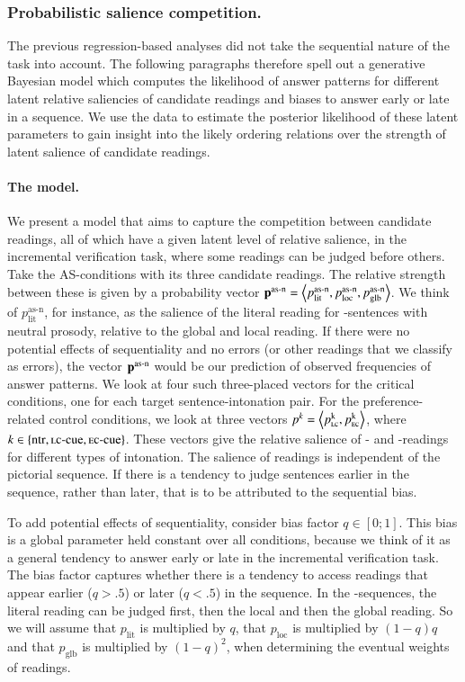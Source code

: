 \documentclass[fleqn,reqno,10pt,draft]{article}
\newcommand{\as}{\acro{as}}
\newcommand{\lc}{\acro{lc}}
\newcommand{\ec}{\acro{ec}}
\begin{document}
\subsubsection{Probabilistic salience competition.} 

The previous regression-based analyses did not take the sequential
nature of the task into account. The following paragraphs therefore
spell out a generative Bayesian model which computes the
likelihood of answer patterns for different latent relative saliencies
of candidate readings and biases to answer early or late in a
sequence. We use the data to estimate the posterior likelihood of
these latent parameters to gain insight into the likely ordering
relations over the strength of latent salience of candidate readings.

\paragraph{The model.} We present a model that aims to capture the
competition between candidate readings, all of which have a given
latent level of relative salience, in the incremental verification
task, where some readings can be judged before others. Take the
AS-conditions with its three candidate readings. The relative strength
between these is given by a probability vector $\mathbf{p}^\text{as-n}
=
\left \langle p^\text{as-n}_{\text{lit}},p^\text{as-n}_{\text{loc}},p^\text{as-n}_{\text{glb}}\right\rangle$. We
think of $p^\text{as-n}_{\text{lit}}$, for instance, as the salience
of the literal reading for \as-sentences with neutral prosody,
relative to the global and local reading. If there were no potential
effects of sequentiality and no errors (or other readings that we
classify as errors), the vector $\mathbf{p}^\text{as-n}$ would be our
prediction of observed frequencies of answer patterns. We look at four
such three-placed vectors for the critical conditions, one for each
target sentence-intonation pair. For the preference-related control
conditions, we look at three vectors $p^k =
\tuple{p^{\text{k}}_{\text{\lc}}, p^{\text{k}}_{\text{\ec}}}$, where
$k \in \set{\text{ntr}, \text{\lc-cue}, \text{\ec-cue}}$. These
vectors give the relative salience of \lc- and \ec-readings for
different types of intonation. The salience of readings is independent
of the pictorial sequence. If there is a tendency to judge sentences
earlier in the sequence, rather than later, that is to be attributed
to the sequential bias.

To add potential effects of sequentiality, consider bias factor $q
\in [0;1]$. This bias is a global parameter held constant over all
conditions, because we think of it as a general tendency to answer
early or late in the incremental verification task. The bias factor
captures whether there is a tendency to access readings that appear
earlier ($q > .5$) or later ($q <.5$) in the sequence. In the
\as-sequences, the literal reading can be judged first, then the local
and then the global reading. So we will assume that $p_{\text{lit}}$
is multiplied by $q$, that $p_{\text{loc}}$ is multiplied by $(1-q)q$
and that $p_{\text{glb}}$ is multiplied by $(1-q)^2$, when determining
the eventual weights of readings.
\end{document}
